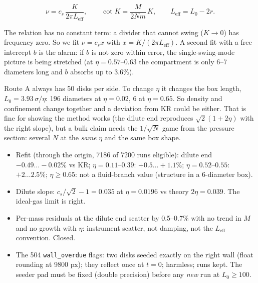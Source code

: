 \documentclass[11pt,a4paper]{article}
\begin{document}
\begin{equation}
\nu = c_s\,\frac{K}{2\pi L_{\mathrm{eff}}},\qquad \cot K = \frac{M}{2Nm}\,K,\qquad L_{\mathrm{eff}} = L_0 - 2r .
\end{equation}

\begin{eli}
The relation has no constant term: a divider that cannot swing ($K\to0$) has frequency zero. So we fit $\nu = c_s x$ with $x = K/(2\pi L_{\mathrm{eff}})$. A second fit with a free intercept $b$ is the alarm: if $b$ is not zero within error, the single-swing-mode picture is being stretched (at $\eta = 0.57$--$0.63$ the compartment is only 6--7 diameters long and $b$ absorbs up to 3.6\%).
\end{eli}

\begin{eli}
Route A always has 50 disks per side. To change $\eta$ it changes the box length, $L_0 = 3.93\,\sigma/\eta$: 196 diameters at $\eta = 0.02$, 6 at $\eta = 0.65$. So density and confinement change together and a deviation from KR could be either. That is fine for showing the method works (the dilute end reproduces $\sqrt2(1+2\eta)$ with the right slope), but a bulk claim needs the $1/\sqrt N$ game from the pressure section: several $N$ at the \emph{same} $\eta$ and the same box shape.
\end{eli}

\begin{num}
\begin{itemize}[nosep]
\item Refit (through the origin, 7186 of 7200 runs eligible): dilute end $-0.49\ldots-0.02\%$ vs KR; $\eta = 0.11$--$0.39$: $+0.5\ldots+1.1\%$; $\eta = 0.52$--$0.55$: $+2\ldots2.5\%$; $\eta\ge0.65$: not a fluid-branch value (structure in a 6-diameter box).
\item Dilute slope: $c_s/\sqrt2 - 1 = 0.035$ at $\eta = 0.0196$ vs theory $2\eta = 0.039$. The ideal-gas limit is right.
\item Per-mass residuals at the dilute end scatter by 0.5--0.7\% with no trend in $M$ and no growth with $\eta$: instrument scatter, not damping, not the $L_{\mathrm{eff}}$ convention. Closed.
\item The 504 \texttt{wall\_overdue} flags: two disks seeded exactly on the right wall (float rounding at 9800 px); they reflect once at $t=0$; harmless; runs kept. The seeder pad must be fixed (double precision) before any \emph{new} run at $L_0\ge100$.
\end{itemize}
\end{num}
\end{document}
